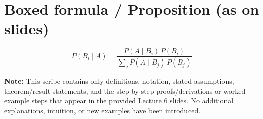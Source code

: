 \documentclass[11pt]{article}
\begin{document}
\section*{Boxed formula / Proposition (as on slides)}
\[
    \boxed{ \;P(B_i\mid A)=\dfrac{P(A\mid B_i)\,P(B_i)}{\sum_j P(A\mid B_j)\,P(B_j)}\; }
\]

\bigskip

\noindent\textbf{Note:} This scribe contains only definitions, notation, stated assumptions, theorem/result statements, and the step-by-step proofs/derivations or worked example steps that appear in the provided Lecture 6 slides. No additional explanations, intuition, or new examples have been introduced.
\end{document}
